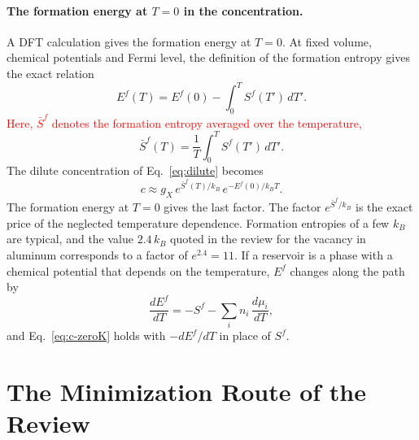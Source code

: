 \documentclass[11pt]{article}      %
\numberwithin{equation}{section}   %
\begin{document}
\paragraph{The formation energy at $T=0$ in the concentration.}
A DFT calculation gives the formation energy at $T=0$. At fixed volume,
chemical potentials and Fermi level, the definition of the formation
entropy gives the exact relation
\begin{equation*}
    E^f(T)=E^f(0)-\int_0^{T}S^f(T')\,dT'.
\end{equation*}
\textcolor{red}{Here, $\bar S^f$ denotes the formation entropy averaged over
the temperature,}
\begin{equation*}
    \bar S^f(T)=\frac{1}{T}\int_0^{T}S^f(T')\,dT'.
\end{equation*}
The dilute concentration of Eq.~\eqref{eq:dilute} becomes
\begin{equation}
    \boxed{c\approx g_X\,e^{\bar S^f(T)/k_B}\,e^{-E^f(0)/k_BT}.}
    \label{eq:c-zeroK}
\end{equation}
The formation energy at $T=0$ gives the last factor. The factor
$e^{\bar S^f/k_B}$ is the exact price of the neglected temperature
dependence. Formation entropies of a few $k_B$ are typical, and the value
$2.4\,k_B$ quoted in the review for the vacancy in aluminum corresponds to a
factor of $e^{2.4}=11$. If a reservoir is a phase with a chemical potential
that depends on the temperature, $E^f$ changes along the path by
\begin{equation*}
    \frac{dE^f}{dT}=-S^f-\sum_in_i\,\frac{d\mu_i}{dT},
\end{equation*}
and Eq.~\eqref{eq:c-zeroK} holds with $-dE^f/dT$ in place of $S^f$.

\section{The Minimization Route of the Review}
\end{document}

